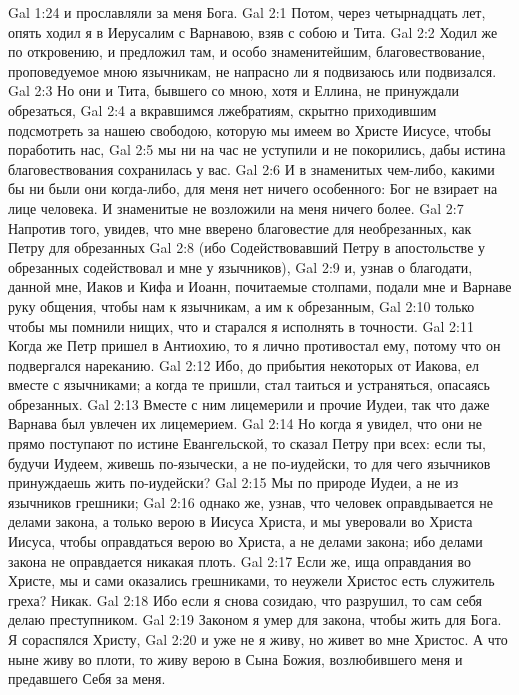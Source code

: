 \vs Gal 1:24 и прославляли за меня Бога.
\vs Gal 2:1 Потом, через четырнадцать лет, опять ходил я в Иерусалим с Варнавою, взяв с собою и Тита.
\vs Gal 2:2 Ходил же по откровению, и предложил там, и особо знаменитейшим, благовествование, проповедуемое мною язычникам, не напрасно ли я подвизаюсь или подвизался.
\vs Gal 2:3 Но они и Тита, бывшего со мною, хотя и Еллина, не принуждали обрезаться,
\vs Gal 2:4 а вкравшимся лжебратиям, скрытно приходившим подсмотреть за нашею свободою, которую мы имеем во Христе Иисусе, чтобы поработить нас,
\vs Gal 2:5 мы ни на час не уступили и не покорились, дабы истина благовествования сохранилась у вас.
\vs Gal 2:6 И в знаменитых чем-либо, какими бы ни были они когда-либо, для меня нет ничего особенного: Бог не взирает на лице человека. И знаменитые не возложили на меня ничего более.
\vs Gal 2:7 Напротив того, увидев, что мне вверено благовестие для необрезанных, как Петру для обрезанных
\vs Gal 2:8 (ибо Содействовавший Петру в апостольстве у обрезанных содействовал и мне у язычников),
\vs Gal 2:9 и, узнав о благодати, данной мне, Иаков и Кифа и Иоанн, почитаемые столпами, подали мне и Варнаве руку общения, чтобы нам  к язычникам, а им к обрезанным,
\vs Gal 2:10 только чтобы мы помнили нищих, что и старался я исполнять в точности.
\rsbpar\vs Gal 2:11 Когда же Петр пришел в Антиохию, то я лично противостал ему, потому что он подвергался нареканию.
\vs Gal 2:12 Ибо, до прибытия некоторых от Иакова, ел вместе с язычниками; а когда те пришли, стал таиться и устраняться, опасаясь обрезанных.
\vs Gal 2:13 Вместе с ним лицемерили и прочие Иудеи, так что даже Варнава был увлечен их лицемерием.
\vs Gal 2:14 Но когда я увидел, что они не прямо поступают по истине Евангельской, то сказал Петру при всех: если ты, будучи Иудеем, живешь по-язычески, а не по-иудейски, то для чего язычников принуждаешь жить по-иудейски?
\vs Gal 2:15 Мы по природе Иудеи, а не из язычников грешники;
\vs Gal 2:16 однако же, узнав, что человек оправдывается не делами закона, а только верою в Иисуса Христа, и мы уверовали во Христа Иисуса, чтобы оправдаться верою во Христа, а не делами закона; ибо делами закона не оправдается никакая плоть.
\vs Gal 2:17 Если же, ища оправдания во Христе, мы и сами оказались грешниками, то неужели Христос есть служитель греха? Никак.
\vs Gal 2:18 Ибо если я снова созидаю, что разрушил, то сам себя делаю преступником.
\vs Gal 2:19 Законом я умер для закона, чтобы жить для Бога. Я сораспялся Христу,
\vs Gal 2:20 и уже не я живу, но живет во мне Христос. А что ныне живу во плоти, то живу верою в Сына Божия, возлюбившего меня и предавшего Себя за меня.
